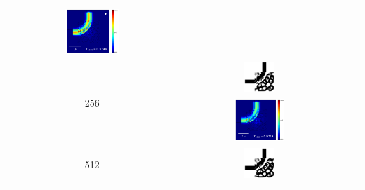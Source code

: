 \begin{table}[ht]
\begin{tabular}{|c|c|c|c|}
      \includegraphics[width=0.33\textwidth]{image/results/bend/GA/visualize_field_fab_128.png} \\
    \hline
      \multirow{2}{*}{256} &
      \includegraphics[width=0.20\textwidth]{image/results/bend/GA/visualize_eps_cont_256.png} \\
      \cline{2-4}
      &
      \includegraphics[width=0.33\textwidth]{image/results/bend/GA/visualize_field_cont_256.png} \\
    \hline
      \multirow{2}{*}{512} &
      \includegraphics[width=0.20\textwidth]{image/results/bend/GA/visualize_eps_cont_512.png} \\

\end{tabular}
\end{table}
